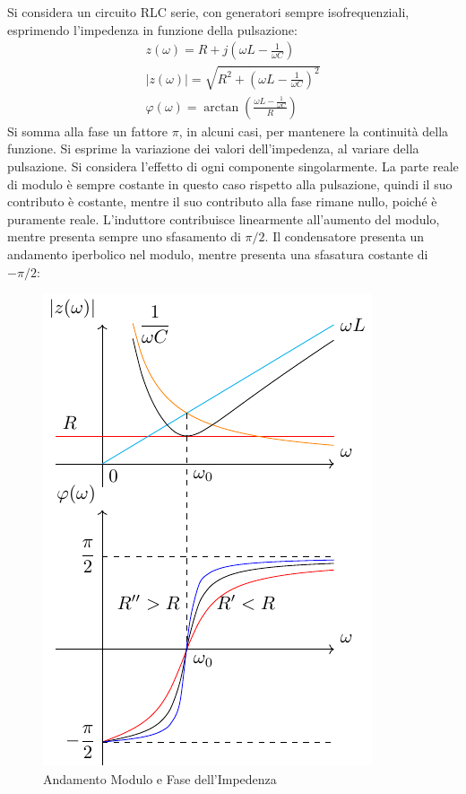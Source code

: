 \documentclass{article}
\numberwithin{equation}{subsection}
\begin{document}
Si considera un circuito RLC serie, con generatori sempre isofrequenziali, esprimendo l'impedenza in funzione della pulsazione:
\begin{gather*}
    z(\omega)=R+j\displaystyle\left(\omega L-\frac{1}{\omega C}\right)\\
    |z(\omega)|=\displaystyle\sqrt{R^2+\left(\omega L-\frac{1}{\omega C}\right)^2}\\
    \varphi(\omega)=\arctan\left(\displaystyle\frac{\displaystyle\omega L-\frac{1}{\omega C}}{R}\right)
\end{gather*}
Si somma alla fase un fattore $\pi$, in alcuni casi, per mantenere la continuità della funzione. Si esprime la variazione dei valori dell'impedenza, al variare della 
pulsazione. Si considera l'effetto di ogni componente singolarmente. La parte reale di modulo è sempre costante in questo caso rispetto alla pulsazione, quindi il suo 
contributo è costante, mentre il suo contributo alla fase rimane nullo, poiché è puramente reale. L'induttore contribuisce linearmente all'aumento del modulo, mentre presenta 
sempre uno sfasamento di $\pi/2$. Il condensatore presenta un andamento iperbolico nel modulo, mentre presenta una sfasatura costante di $-\pi/2$:
\begin{figure}[ht]%
    \centering
    \includegraphics{andamento-impedenza-rlc-serie.pdf}
    \caption{Andamento Modulo e Fase dell'Impedenza}
    \label{fig:andamento-impedenza-rlc-serie}
\end{figure}
\end{document}
